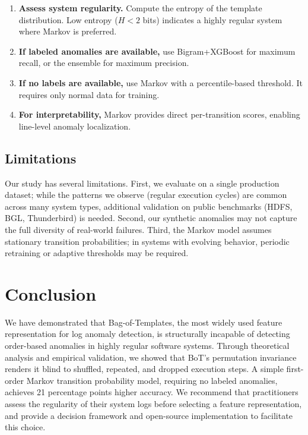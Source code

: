 \documentclass[11pt]{article}
\begin{document}
\begin{enumerate}[leftmargin=*,itemsep=2pt]
    \item \textbf{Assess system regularity.} Compute the entropy of the template distribution. Low entropy ($H < 2$ bits) indicates a highly regular system where Markov is preferred.
    \item \textbf{If labeled anomalies are available,} use Bigram+XGBoost for maximum recall, or the ensemble for maximum precision.
    \item \textbf{If no labels are available,} use Markov with a percentile-based threshold. It requires only normal data for training.
    \item \textbf{For interpretability,} Markov provides direct per-transition scores, enabling line-level anomaly localization.
\end{enumerate}

\subsection{Limitations}

Our study has several limitations.
First, we evaluate on a single production dataset; while the patterns we observe (regular execution cycles) are common across many system types, additional validation on public benchmarks (HDFS, BGL, Thunderbird) is needed.
Second, our synthetic anomalies may not capture the full diversity of real-world failures.
Third, the Markov model assumes stationary transition probabilities; in systems with evolving behavior, periodic retraining or adaptive thresholds may be required.

\section{Conclusion}
\label{sec:conclusion}

We have demonstrated that Bag-of-Templates, the most widely used feature representation for log anomaly detection, is structurally incapable of detecting order-based anomalies in highly regular software systems.
Through theoretical analysis and empirical validation, we showed that BoT's permutation invariance renders it blind to shuffled, repeated, and dropped execution steps.
A simple first-order Markov transition probability model, requiring no labeled anomalies, achieves 21 percentage points higher accuracy.
We recommend that practitioners assess the regularity of their system logs before selecting a feature representation, and provide a decision framework and open-source implementation to facilitate this choice.
\end{document}
